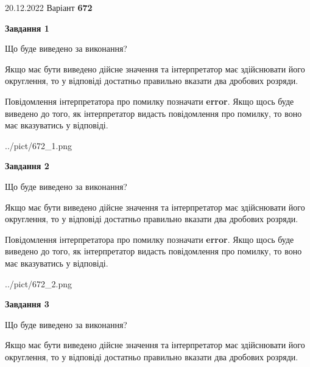 \documentclass[12pt, ukrainian]{article}
\begin{document}
{20.12.2022 Варіант \No \textbf { 672 }\par}
{
\begin {Large}

{\begin {center}\textbf{Завдання 1}\end {center}}\par
Що буде виведено за виконання? \par

Якщо має бути виведено дійсне значення та інтерпретатор має здійснювати його округлення, 
то у відповіді достатньо правильно вказати два дробових розряди.

Повідомлення інтерпретатора про помилку позначати \textbf{error}.
Якщо щось буде виведено до того, як інтерпретатор видасть повідомлення про помилку, 
то воно має вказуватись у відповіді. \par

\begin{center}
	{../pict/672_1.png}
\end{center}
\newpage

{\begin {center}\textbf{Завдання 2}\end {center}}\par
Що буде виведено за виконання? \par

Якщо має бути виведено дійсне значення та інтерпретатор має здійснювати його округлення, 
то у відповіді достатньо правильно вказати два дробових розряди.

Повідомлення інтерпретатора про помилку позначати \textbf{error}.
Якщо щось буде виведено до того, як інтерпретатор видасть повідомлення про помилку, 
то воно має вказуватись у відповіді. \par

\begin{center}
	{../pict/672_2.png}
\end{center}
\newpage

{\begin {center}\textbf{Завдання 3}\end {center}}\par
Що буде виведено за виконання? \par

Якщо має бути виведено дійсне значення та інтерпретатор має здійснювати його округлення, 
то у відповіді достатньо правильно вказати два дробових розряди.


\end{Large}}
\end{document}
